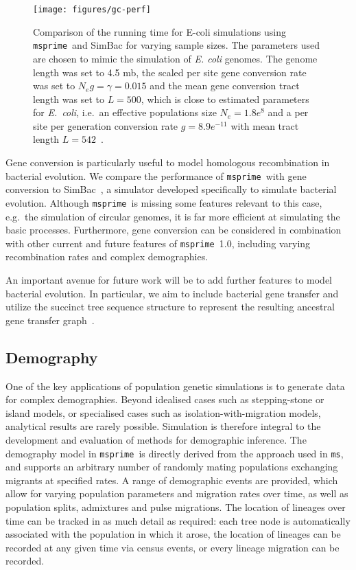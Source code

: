 \documentclass{article}
\newcommand{\msprime}[0]{\texttt{msprime}}
\newcommand{\ms}[0]{\texttt{ms}}
\begin{document}
\begin{figure}
\begin{center}
\texttt{[image: figures/gc-perf]}
\end{center}
\caption{\label{fig-gc-perf}Comparison of the running time
for E-coli simulations using \msprime\ and SimBac for varying
sample sizes. The parameters used are chosen to mimic the simulation
of \textit{E. coli} genomes. The genome length was set to 4.5 mb, the scaled per site
gene conversion rate was set to $N_e g = \gamma = 0.015$ and
the mean gene conversion tract length was set to $L = 500$, which is close to
estimated parameters for \textit{E.\ coli}, i.e.\ an effective populations size
$N_e = 1.8e^8$ and a per site per generation conversion rate $g = 8.9e^{-11}$
with mean tract length $L = 542$~\citep{lapierre2016the}.}
\end{figure}

Gene conversion is particularly useful to model homologous recombination in
bacterial evolution.
We compare the performance of \msprime\ with gene conversion to
SimBac~\citep{brown2016simbac}, a simulator developed specifically to
simulate bacterial evolution. Although \msprime\ is missing some features
relevant to this case, e.g.\ the simulation of circular genomes, it is far
more efficient at simulating the basic processes.
Furthermore, gene conversion can be considered in combination
with other current and future features of \msprime\ 1.0,
including varying recombination rates and complex demographies.

An important avenue for future work
will be to add further features to model bacterial
evolution. In particular, we aim to include bacterial gene transfer and utilize
the succinct tree sequence structure to represent the resulting ancestral gene
transfer graph~\citep{baumdicker2014AGTG}.

\subsection*{Demography}
One of the key applications of population genetic simulations is to generate
data for complex demographies. Beyond idealised cases such as stepping-stone or
island models, or specialised cases such as isolation-with-migration models,
analytical results are rarely possible. Simulation is therefore integral to the
development and evaluation of methods for demographic inference. The demography
model in \msprime\ is directly derived from the approach used in \ms, and
supports an arbitrary number of randomly mating populations exchanging migrants
at specified rates. A range of demographic events are provided, which allow for
varying population parameters and migration rates over time, as well as
population splits, admixtures and pulse migrations. The location of lineages
over time can be tracked in as much detail as required: each tree node is
automatically associated with the population in which it arose, the location of
lineages can be recorded at any given time via census events, or every lineage
migration can be recorded.
\end{document}
